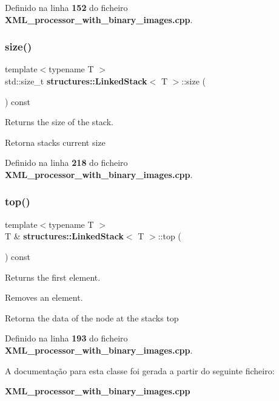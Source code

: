 Definido na linha \textbf{ 152} do ficheiro \textbf{ X\+M\+L\+\_\+processor\+\_\+with\+\_\+binary\+\_\+images.\+cpp}.

\mbox{\label{classstructures_1_1_linked_stack_ae1ca6a5a9b837471863f1c8bb23cfe1d}} 
\subsubsection{size()}
{\footnotesize\ttfamily template$<$typename T $>$ \\
std\+::size\+\_\+t \textbf{ structures\+::\+Linked\+Stack}$<$ T $>$\+::size (\begin{DoxyParamCaption}{ }\end{DoxyParamCaption}) const}



Returns the size of the stack. 

\begin{DoxyReturn}{Retorna}
stack\textquotesingle{}s current size 
\end{DoxyReturn}


Definido na linha \textbf{ 218} do ficheiro \textbf{ X\+M\+L\+\_\+processor\+\_\+with\+\_\+binary\+\_\+images.\+cpp}.

\mbox{\label{classstructures_1_1_linked_stack_a14ab6e3507dd1206a87bba8c57e1733f}} 
\subsubsection{top()}
{\footnotesize\ttfamily template$<$typename T $>$ \\
T \& \textbf{ structures\+::\+Linked\+Stack}$<$ T $>$\+::top (\begin{DoxyParamCaption}{ }\end{DoxyParamCaption}) const}



Returns the first element. 

Removes an element.

\begin{DoxyReturn}{Retorna}
the data of the node at the stack\textquotesingle{}s top 
\end{DoxyReturn}


Definido na linha \textbf{ 193} do ficheiro \textbf{ X\+M\+L\+\_\+processor\+\_\+with\+\_\+binary\+\_\+images.\+cpp}.



A documentação para esta classe foi gerada a partir do seguinte ficheiro\+:\begin{DoxyCompactItemize}
\item 
\textbf{ X\+M\+L\+\_\+processor\+\_\+with\+\_\+binary\+\_\+images.\+cpp}\end{DoxyCompactItemize}
